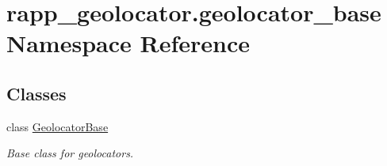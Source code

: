 \hypertarget{namespacerapp__geolocator_1_1geolocator__base}{\section{rapp\-\_\-geolocator.\-geolocator\-\_\-base Namespace Reference}
\label{namespacerapp__geolocator_1_1geolocator__base}
}
\subsection*{Classes}
\begin{DoxyCompactItemize}
\item 
class \hyperlink{classrapp__geolocator_1_1geolocator__base_1_1GeolocatorBase}{Geolocator\-Base}
\begin{DoxyCompactList}\small\item\em Base class for geolocators. \end{DoxyCompactList}\end{DoxyCompactItemize}
